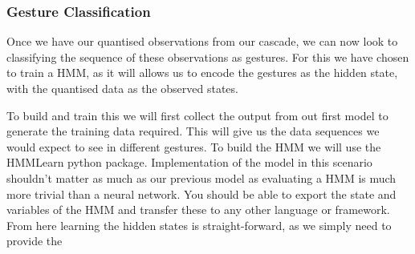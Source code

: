 


\subsubsection{Gesture Classification}\nl
Once we have our quantised observations from our cascade, we can now look to classifying the sequence of these observations as gestures.
For this we have chosen to train a HMM, as it will allows us to encode the gestures as the hidden state, with the quantised data as the observed states.

To build and train this we will first collect the output from out first model to generate the training data required. This will give us the data sequences we would expect to see in different gestures.
To build the HMM we will use the HMMLearn python package. Implementation of the model in this scenario shouldn't matter as much as our previous model as evaluating a HMM is much more trivial than a neural network. You should be able to export the state and variables of the HMM and transfer these to any other language or framework.
From here learning the hidden states is straight-forward, as we simply need to provide the 


